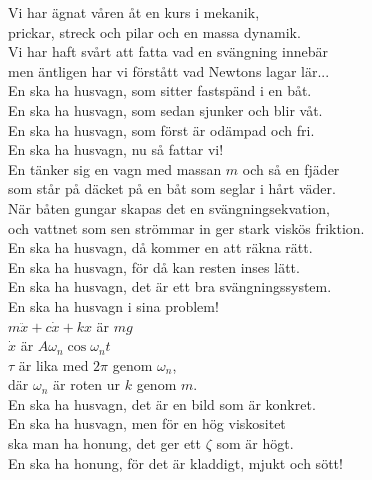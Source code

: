 \documentclass[a6paper, 10pt, twoside]{article}
\begin{document}
\noindent
\begin{center}
\end{center}
\begin{lyrics}
Vi har ägnat våren åt en kurs i mekanik, \\
prickar, streck och pilar och en massa dynamik. \\
Vi har haft svårt att fatta vad en svängning innebär\\ 
men äntligen har vi förstått vad Newtons lagar lär...
\vspace{5pt} \\
En ska ha husvagn, som sitter fastspänd i en båt. \\
En ska ha husvagn, som sedan sjunker och blir våt. \\
En ska ha husvagn, som först är odämpad och fri. \\
En ska ha husvagn, nu så fattar vi! 
\vspace{5pt} \\
En tänker sig en vagn med massan $m$ och så en fjäder \\
som står på däcket på en båt som seglar i hårt väder. \\
När båten gungar skapas det en svängningsekvation, \\
och vattnet som sen strömmar in ger stark viskös friktion. 
\vspace{5pt} \\
En ska ha husvagn, då kommer en att räkna rätt. \\
En ska ha husvagn, för då kan resten inses lätt. \\
En ska ha husvagn, det är ett bra svängningssystem. \\
En ska ha husvagn i sina problem! 
\vspace{5pt} \\
$m \ddot{x} + c \dot{x} + k x$ är $m g$ \\
$\dot{x}$ är $A \omega_n \cos \omega_n t$ \\
$\tau$ är lika med $2\pi$ genom $\omega_n$, \\
där $\omega_n$ är roten ur $k$ genom $m$.
\vspace{5pt} \\
En ska ha husvagn, det är en bild som är konkret. \\
En ska ha husvagn, men för en hög viskositet \\
ska man ha honung, det ger ett $\zeta$ som är högt. \\
En ska ha honung, för det är kladdigt, mjukt och sött! 
\end{lyrics}
\end{document}
